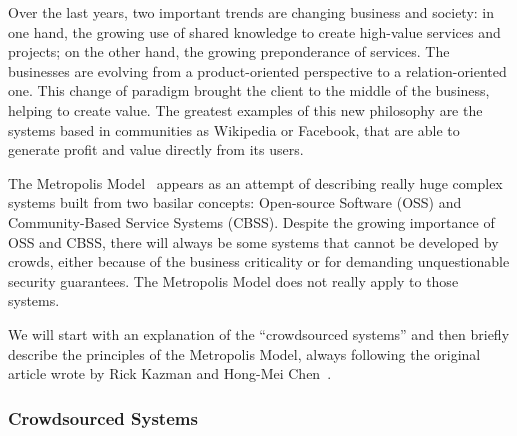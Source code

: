 Over the last years, two important trends are changing business and society: in one hand, the growing use of shared knowledge to create high-value services and projects; on the other hand, the growing preponderance of services. The businesses are evolving from a product-oriented perspective to a relation-oriented one. This change of paradigm brought the client to the middle of the business, helping to create value. The greatest examples of this new philosophy are the systems based in communities as Wikipedia or Facebook, that are able to generate profit and value directly from its users.

The Metropolis Model~\citep{Kazman2009} appears as an attempt of describing really huge complex systems built from two basilar concepts: Open-source Software (OSS) and Community-Based Service Systems (CBSS). Despite the growing importance of OSS and CBSS, there will always be some systems that cannot be developed by crowds, either because of the business criticality or for demanding unquestionable security guarantees. The Metropolis Model does not really apply to those systems.

We will start with an explanation of the ``crowdsourced systems'' and then briefly describe the principles of the Metropolis Model, always following the original article wrote by Rick Kazman and Hong-Mei Chen~\citep{Kazman2009}.

\subsubsection{Crowdsourced Systems}

